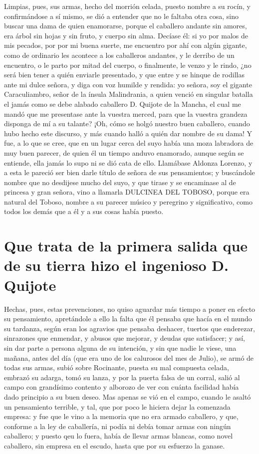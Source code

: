 \documentclass[12pt,
               twocolumn
              ]{article}
\begin{document}
Limpias, pues, sus armas, hecho del morrión celada, puesto nombre a su
rocín, y confirmándose a sí mismo, se dió a entender que no le faltaba
otra cosa, sino buscar una dama de quien enamorarse, porque el
caballero andante sin amores, era árbol sin hojas y sin fruto, y
cuerpo sin alma. Decíase él: si yo por malos de mis pecados, por por
mi buena suerte, me encuentro por ahí con algún gigante, como de
ordinario les acontece a los caballeros andantes, y le derribo de un
encuentro, o le parto por mitad del cuerpo, o finalmente, le venzo y
le rindo, ¿no será bien tener a quién enviarle presentado, y que entre
y se hinque de rodillas ante mi dulce señora, y diga con voz humilde y
rendida: yo señora, soy el gigante Caraculiambro, señor de la ínsula
Malindrania, a quien venció en singular batalla el jamás como se debe
alabado caballero D. Quijote de la Mancha, el cual me mandó que me
presentase ante la vuestra merced, para que la vuestra grandeza
disponga de mí a su talante? ¡Oh, cómo se holgó nuestro buen
caballero, cuando hubo hecho este discurso, y más cuando halló a quién
dar nombre de su dama! Y fue, a lo que se cree, que en un lugar cerca
del suyo había una moza labradora de muy buen parecer, de quien él un
tiempo anduvo enamorado, aunque según se entiende, ella jamás lo supo
ni se dió cata de ello. Llamábase Aldonza Lorenzo, y a esta le pareció
ser bien darle título de señora de sus pensamientos; y buscándole
nombre que no desdijese mucho del suyo, y que tirase y se encaminase
al de princesa y gran señora, vino a llamarla DULCINEA DEL TOBOSO,
porque era natural del Toboso, nombre a su parecer músico y peregrino
y significativo, como todos los demás que a él y a sus cosas había
puesto.

\section{Que trata de la primera salida que de su tierra hizo el ingenioso D. Quijote}
\label{segundo_capitulo}


\begin{flushleft}
Hechas, pues, estas prevenciones, no quiso aguardar más tiempo a poner
en efecto su pensamiento, apretándole a ello la falta que él pensaba
que hacía en el mundo su tardanza, según eran los agravios que pensaba
deshacer, tuertos que enderezar, sinrazones que enmendar, y abusos que
mejorar, y deudas que satisfacer; y así, sin dar parte a persona
alguna de su intención, y sin que nadie le viese, una mañana, antes
del día (que era uno de los calurosos del mes de Julio), se armó de
todas sus armas, subió sobre Rocinante, puesta su mal compuesta
celada, embrazó su adarga, tomó su lanza, y por la puerta falsa de un
corral, salió al campo con grandísimo contento y alborozo de ver con
cuánta facilidad había dado principio a su buen deseo. Mas apenas se
vió en el campo, cuando le asaltó un pensamiento terrible, y tal, que
por poco le hiciera dejar la comenzada empresa: y fue que le vino a la
memoria que no era armado caballero, y que, conforme a la ley de
caballería, ni podía ni debía tomar armas con ningún caballero; y
puesto qeu lo fuera, había de llevar armas blancas, como novel
caballero, sin empresa en el escudo, hasta que por su esfuerzo la
ganase.  
\end{flushleft}
\end{document}
